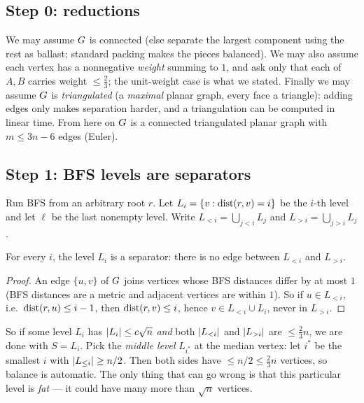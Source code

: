 \subsection{Step 0: reductions}

We may assume $G$ is connected (else separate the largest component using the rest as ballast; standard packing makes the pieces balanced). We may also assume each vertex has a nonnegative \emph{weight} summing to $1$, and ask only that each of $A,B$ carries weight $\le \tfrac23$; the unit-weight case is what we stated. Finally we may assume $G$ is \emph{triangulated} (a \emph{maximal} planar graph, every face a triangle): adding edges only makes separation harder, and a triangulation can be computed in linear time. From here on $G$ is a connected triangulated planar graph with $m\le 3n-6$ edges (Euler).

\subsection{Step 1: BFS levels are separators}

Run BFS from an arbitrary root $r$. Let $L_i=\{v:\operatorname{dist}(r,v)=i\}$ be the $i$-th level and let $\ell$ be the last nonempty level. Write $L_{<i}=\bigcup_{j<i}L_j$ and $L_{>i}=\bigcup_{j>i}L_j$.

\begin{lemma}\label{ch27:lem-levelsep}
For every $i$, the level $L_i$ is a separator: there is no edge between $L_{<i}$ and $L_{>i}$.
\end{lemma}

\begin{proof}
An edge $\{u,v\}$ of $G$ joins vertices whose BFS distances differ by at most $1$ (BFS distances are a metric and adjacent vertices are within $1$). So if $u\in L_{<i}$, i.e.\ $\operatorname{dist}(r,u)\le i-1$, then $\operatorname{dist}(r,v)\le i$, hence $v\in L_{<i}\cup L_i$, never in $L_{>i}$.
\end{proof}

So if some level $L_i$ has $\lvert L_i\rvert\le c\sqrt n$ \emph{and} both $\lvert L_{<i}\rvert$ and $\lvert L_{>i}\rvert$ are $\le \tfrac23 n$, we are done with $S=L_i$. Pick the \emph{middle level} $L_{i^*}$ at the median vertex: let $i^*$ be the smallest $i$ with $\lvert L_{\le i}\rvert\ge n/2$. Then both sides have $\le n/2 \le \tfrac23 n$ vertices, so balance is automatic. The only thing that can go wrong is that this particular level is \emph{fat} --- it could have many more than $\sqrt n$ vertices.

